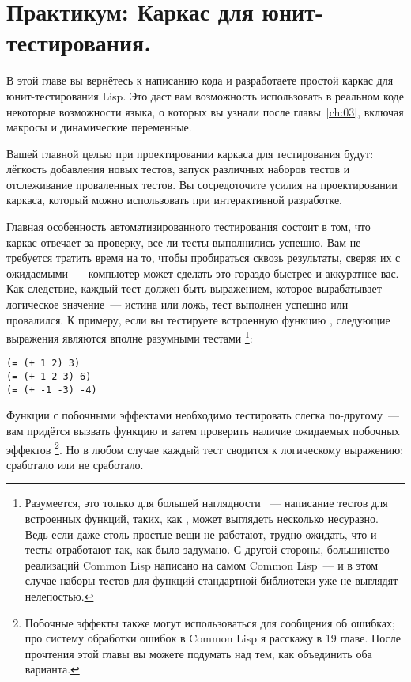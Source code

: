 \chapter{Практикум: Каркас для юнит-тестирования.}
\label{ch:09}

В этой главе вы вернётесь к написанию кода и разработаете простой каркас для
юнит-тестирования Lisp. Это даст вам возможность использовать в реальном коде некоторые
возможности языка, о которых вы узнали после главы~\ref{ch:03}, включая макросы и динамические
переменные.

Вашей главной целью при проектировании каркаса для тестирования будут: лёгкость добавления
новых тестов, запуск различных наборов тестов и отслеживание проваленных тестов. Вы
сосредоточите усилия на проектировании каркаса, который можно использовать при
интерактивной разработке.

Главная особенность автоматизированного тестирования состоит в том, что каркас отвечает за
проверку, все ли тесты выполнились успешно. Вам не требуется тратить время на то, чтобы
пробираться сквозь результаты, сверяя их с ожидаемыми~--- компьютер может сделать это
гораздо быстрее и аккуратнее вас. Как следствие, каждый тест должен быть выражением,
которое вырабатывает логическое значение~--- истина или ложь, тест выполнен успешно или
провалился. К примеру, если вы тестируете встроенную функцию \code{+}, следующие выражения
являются вполне разумными тестами \footnote{Разумеется, это только для большей наглядности
 ~--- написание тестов для встроенных функций, таких, как \code{+}, может выглядеть
  несколько несуразно. Ведь если даже столь простые вещи не работают, трудно ожидать, что
  и тесты отработают так, как было задумано. С другой стороны, большинство реализаций
  Common Lisp написано на самом Common Lisp~--- и в этом случае наборы тестов для функций
  стандартной библиотеки уже не выглядят нелепостью.}:

\begin{lstlisting}
(= (+ 1 2) 3)
(= (+ 1 2 3) 6)
(= (+ -1 -3) -4)
\end{lstlisting}

Функции с побочными эффектами необходимо тестировать слегка по-другому~--- вам придётся
вызвать функцию и затем проверить наличие ожидаемых побочных эффектов \footnote{Побочные
  эффекты также могут использоваться для сообщения об ошибках; про систему обработки
  ошибок в Common Lisp я расскажу в 19 главе.  После прочтения этой главы вы можете
  подумать над тем, как объединить оба варианта.}. Но в любом случае каждый тест сводится
к логическому выражению: сработало или не сработало.

